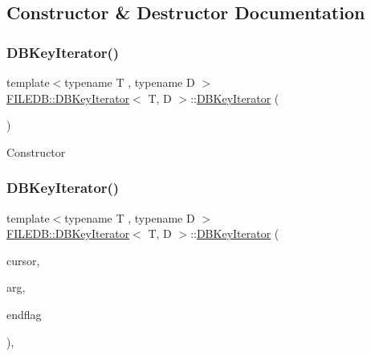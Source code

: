 \subsection{Constructor \& Destructor Documentation}
\mbox{\label{classFILEDB_1_1DBKeyIterator_aece085c0a59d87759e01613b5c64ef36}} 
\subsubsection{\texorpdfstring{DBKeyIterator()}{DBKeyIterator()}\hspace{0.1cm}{\footnotesize\ttfamily [1/9]}}
{\footnotesize\ttfamily template$<$typename T , typename D $>$ \\
\mbox{\hyperlink{classFILEDB_1_1DBKeyIterator}{F\+I\+L\+E\+D\+B\+::\+D\+B\+Key\+Iterator}}$<$ T, D $>$\+::\mbox{\hyperlink{classFILEDB_1_1DBKeyIterator}{D\+B\+Key\+Iterator}} (\begin{DoxyParamCaption}\item[{void}]{ }\end{DoxyParamCaption})\hspace{0.3cm}{\ttfamily [inline]}}

Constructor \mbox{\label{classFILEDB_1_1DBKeyIterator_a7dc82bdde4a77bcadd704a3e87f6534a}} 
\subsubsection{\texorpdfstring{DBKeyIterator()}{DBKeyIterator()}\hspace{0.1cm}{\footnotesize\ttfamily [2/9]}}
{\footnotesize\ttfamily template$<$typename T , typename D $>$ \\
\mbox{\hyperlink{classFILEDB_1_1DBKeyIterator}{F\+I\+L\+E\+D\+B\+::\+D\+B\+Key\+Iterator}}$<$ T, D $>$\+::\mbox{\hyperlink{classFILEDB_1_1DBKeyIterator}{D\+B\+Key\+Iterator}} (\begin{DoxyParamCaption}\item[{const \mbox{\hyperlink{classFILEDB_1_1DBCursor}{D\+B\+Cursor}} \&}]{cursor,  }\item[{const T \&}]{arg,  }\item[{int}]{endflag }\end{DoxyParamCaption})\hspace{0.3cm}{\ttfamily [inline]}, {\ttfamily [explicit]}}


